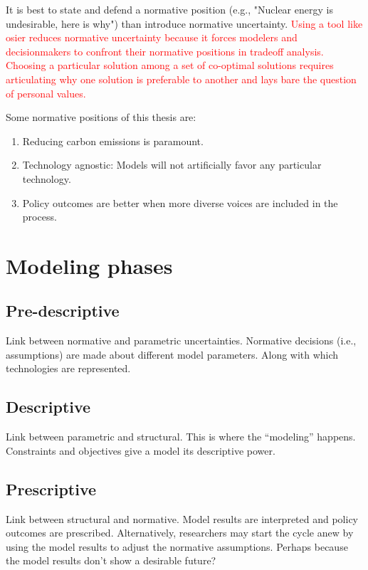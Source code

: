It is best to state and defend a normative position (e.g., "Nuclear energy is
undesirable, here is why") than introduce normative uncertainty.
\textcolor{red}{Using a tool like \ac{osier} reduces normative uncertainty
because it forces modelers and decisionmakers to confront their normative
positions in tradeoff analysis. Choosing a particular solution among a set of
co-optimal solutions requires articulating why one solution is preferable to
another and lays bare the question of personal values.}

Some normative positions of this thesis are:
\begin{enumerate}
    \item Reducing carbon emissions is paramount.
    \item Technology agnostic: Models will not artificially favor any particular technology.
    \item Policy outcomes are better when more diverse voices are included in the process.
\end{enumerate}

\section{Modeling phases}

\subsection{Pre-descriptive}

Link between normative and parametric uncertainties. Normative decisions (i.e., assumptions)
are made about different model parameters. Along with which technologies are represented.

\subsection{Descriptive}
Link between parametric and structural. This is where the ``modeling'' happens. Constraints
and objectives give a model its descriptive power.

\subsection{Prescriptive}
Link between structural and normative. Model results are interpreted and policy outcomes
are prescribed. Alternatively, researchers may start the cycle anew by using the model
results to adjust the normative assumptions. Perhaps because the model results don't show
a desirable future?


